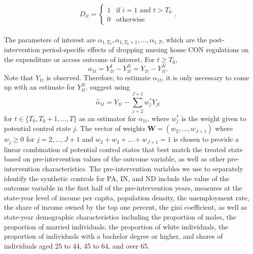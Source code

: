 \documentclass[../Main.tex]{subfiles}
\begin{document}
\begin{equation}
    D_{it}= 
\begin{cases}
    1 & \text{if } i=1 \text{ and } t>T_0\\
    0             & \text{otherwise}
\end{cases}.
\end{equation}\\
\indent The parameters of interest are $\alpha_{1,T_0},\alpha_{1,T_0+1},\dots,\alpha_{1,T}$, which are the post-intervention period-specific effects of dropping nursing home CON regulations on the expenditure or access outcome of interest. For $t\geq T_0$,
\begin{equation}
    \alpha_{1t}=Y_{1t}^I-Y_{1t}^N=Y_{1t}-Y_{1t}^N .
\end{equation}
Note that $Y_{1t}$ is observed. Therefore, to estimate $\alpha_{1t}$, it is only necessary to come up with an estimate for $Y_{1t}^N$. \citet{abadie2010synthetic} suggest using 
\begin{equation} \label{eq:year_spec_effect}
    \hat{\alpha}_{1t}=Y_{1t}-\sum_{j=2}^{J+1}w_j^*Y_{jt} 
\end{equation}
for $t\in\{T_0,T_0+1,\dots,T\}$ as an estimator for $\alpha_{1t}$, where $w_j^*$ is the weight given to potential control state $j$. The vector of weights $\mathbf{W} = (w_2,\dots,w_{J+1})$ where $w_j\geq 0$ for $j=2,\dots,J+1$ and $w_2+w_3+\dots+w_{J+1}=1$ is chosen to provide a linear combination of potential control states that best match the treated state based on pre-intervention values of the outcome variable, as well as other pre-intervention characteristics. The pre-intervention variables we use to separately identify the synthetic controls for PA, IN, and ND include the value of the outcome variable in the first half of the pre-intervention years, measures at the state-year level of income per capita, population density, the unemployment rate, the share of income owned by the top one percent, the gini coefficient, as well as state-year demographic characteristics including the proportion of males, the proportion of married individuals, the proportion of white individuals, the proportion of individuals with a bachelor degree or higher, and shares of individuals aged 25 to 44, 45 to 64, and over 65.\\
\end{document}
